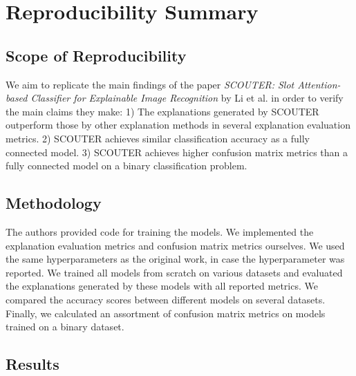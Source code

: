 \section{Reproducibility Summary}
\subsection*{Scope of Reproducibility}

We aim to replicate the main findings of the paper \textit{SCOUTER: Slot Attention-based Classifier for Explainable Image Recognition} by Li et al. in order to verify the main claims they make: 1) The explanations generated by SCOUTER outperform those by other explanation methods in several explanation evaluation metrics. 2) SCOUTER achieves similar classification accuracy as a fully connected model. 3) SCOUTER achieves higher confusion matrix metrics than a fully connected model on a binary classification problem.

\subsection*{Methodology}

The authors provided code for training the models. We implemented the explanation evaluation metrics and confusion matrix metrics ourselves. We used the same hyperparameters as the original work, in case the hyperparameter was reported. We trained all models from scratch on various datasets and evaluated the explanations generated by these models with all reported metrics. We compared the accuracy scores between different models on several datasets. Finally, we calculated an assortment of confusion matrix metrics on models trained on a binary dataset.

\subsection*{Results}

